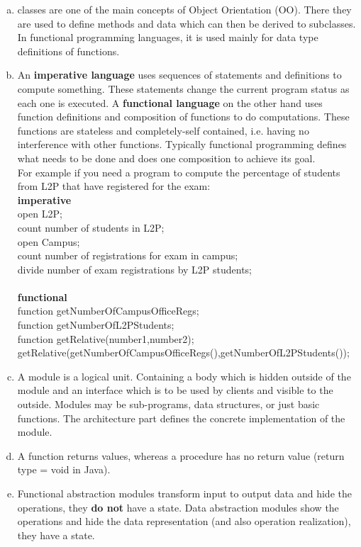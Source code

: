 \documentclass[a4paper,10pt]{scrartcl}[2003/01/01]
\begin{document}
    \begin{enumerate}[a)]
		\item classes are one of the main concepts of Object Orientation (OO). There they are used to define methods and data which can then be derived to subclasses. In functional programming languages, it is used mainly for data type definitions of functions.
		\item An \textbf{imperative language} uses sequences of statements and definitions to compute something. These statements change the current program status as each one is executed. A \textbf{functional language} on the other hand uses function definitions and composition of functions to do computations. These functions are stateless and completely-self contained, i.e. having no interference with other functions. Typically functional programming defines what needs to be done and does one composition to achieve its goal.\\For example if you need a program to compute the percentage of students from L2P that have registered for the exam:\\
		\textbf{imperative}\\
		open L2P;\\
		count number of students in L2P;\\
		open Campus;\\
		count number of registrations for exam in campus;\\
		divide number of exam registrations by L2P students;\\~\\
		\textbf{functional}\\
		function getNumberOfCampusOfficeRegs;\\
		function getNumberOfL2PStudents;\\
		function getRelative(number1,number2);\\
		getRelative(getNumberOfCampusOfficeRegs(),getNumberOfL2PStudents());
		\item A module is a logical unit. Containing a body which is hidden outside of the module and an interface which is to be used by clients and visible to the outside. Modules may be sub-programs, data structures, or just basic functions. The architecture part defines the concrete implementation of the module.
		\item A function returns values, whereas a procedure has no return value (return type = void in Java).
		\item Functional abstraction modules transform input to output data and hide the operations, they \textbf{do not} have a state. Data abstraction modules show the operations and hide the data representation (and also operation realization), they have a state.
	\end{enumerate}
\end{document}
